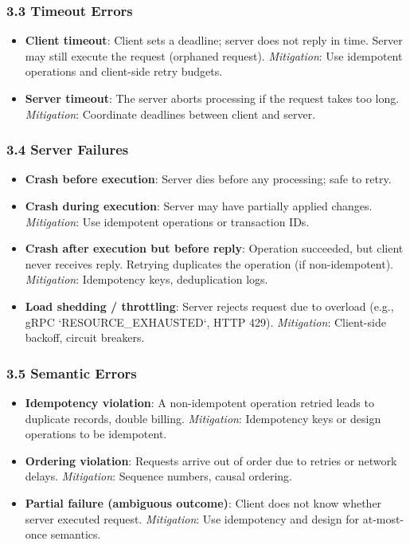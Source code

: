 \documentclass[a4paper]{article}
\begin{document}
\subsubsection{3.3 Timeout Errors}
\begin{itemize}
    \item \textbf{Client timeout}: Client sets a deadline; server does not reply in time. Server may still execute the request (orphaned request). \textit{Mitigation}: Use idempotent operations and client-side retry budgets.
    \item \textbf{Server timeout}: The server aborts processing if the request takes too long. \textit{Mitigation}: Coordinate deadlines between client and server.
\end{itemize}

\subsubsection{3.4 Server Failures}
\begin{itemize}
    \item \textbf{Crash before execution}: Server dies before any processing; safe to retry.
    \item \textbf{Crash during execution}: Server may have partially applied changes. \textit{Mitigation}: Use idempotent operations or transaction IDs.
    \item \textbf{Crash after execution but before reply}: Operation succeeded, but client never receives reply. Retrying duplicates the operation (if non-idempotent). \textit{Mitigation}: Idempotency keys, deduplication logs.
    \item \textbf{Load shedding / throttling}: Server rejects request due to overload (e.g.,  gRPC `RESOURCE\_EXHAUSTED`, HTTP 429). \textit{Mitigation}: Client-side backoff, circuit breakers.
\end{itemize}

\subsubsection{3.5 Semantic Errors}
\begin{itemize}
    \item \textbf{Idempotency violation}: A non-idempotent operation retried leads to duplicate records, double billing. \textit{Mitigation}: Idempotency keys or design operations to be idempotent.
    \item \textbf{Ordering violation}: Requests arrive out of order due to retries or network delays. \textit{Mitigation}: Sequence numbers, causal ordering.
    \item \textbf{Partial failure (ambiguous outcome)}: Client does not know whether server executed request. \textit{Mitigation}: Use idempotency and design for at-most-once semantics.
\end{itemize}
\end{document}
